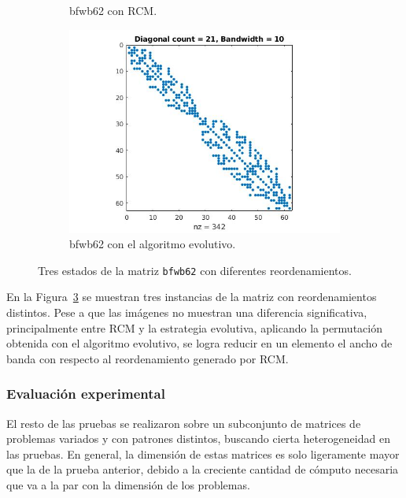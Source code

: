 \begin{figure}
\begin{subfigure}[t]{.3\textwidth}
  \caption{bfwb62 con RCM.}
  \label{fig:bfwb62_rcm_spy}
\end{subfigure}
\begin{subfigure}[t]{.3\textwidth}
  \centering
  \includegraphics[width=\linewidth]{imagenes/chap4/bfwb62_ga_band_spy.jpg}
  \caption{bfwb62 con el algoritmo evolutivo.}
  \label{fig:bfwb62_ga_spy}
\end{subfigure}
\caption{Tres estados de la matriz \texttt{bfwb62} con diferentes reordenamientos.}
\label{fig:bfwb62_band}
\end{figure}
En la Figura~\ref{fig:bfwb62_band} se muestran tres instancias de la matriz con reordenamientos distintos. Pese a que las imágenes no muestran una diferencia significativa, principalmente entre RCM y la estrategia evolutiva, aplicando la permutación obtenida con el algoritmo evolutivo, se logra reducir en un elemento el ancho de banda con respecto al reordenamiento generado por RCM. 

\subsubsection*{Evaluación experimental}

El resto de las pruebas se realizaron sobre un subconjunto de matrices de problemas variados y con patrones distintos, buscando cierta heterogeneidad en las pruebas. En general, la dimensión de estas matrices es solo ligeramente mayor que la de la prueba anterior, debido a la creciente cantidad de cómputo necesaria que va a la par con la dimensión de los problemas.

